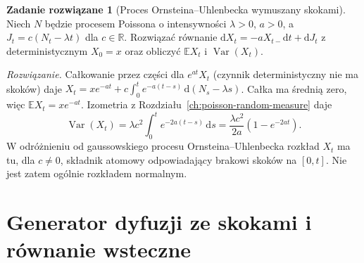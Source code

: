 \documentclass[11pt,a4paper,oneside]{report}
\numberwithin{equation}{chapter}
\theoremstyle{plain}
\theoremstyle{definition}
\newtheorem{zadanie}{Zadanie rozwiązane}[chapter]
\theoremstyle{remark}
\newcommand{\R}{\mathbb{R}}
\newcommand{\E}{\mathbb{E}}
\newcommand{\Var}{\operatorname{Var}}
\newcommand{\dd}{\mathrm{d}}
\begin{document}
\begin{zadanie}[Proces Ornsteina--Uhlenbecka wymuszany skokami]
Niech $N$ będzie procesem Poissona o intensywności
$\lambda>0$, $a>0$, a $J_t=c(N_t-\lambda t)$ dla
$c\in\R$. Rozwiązać równanie
$\dd X_t=-aX_{t-}\dd t+\dd J_t$ z deterministycznym
$X_0=x$ oraz obliczyć $\E X_t$ i $\Var(X_t)$.

\emph{Rozwiązanie.} Całkowanie przez części dla
$e^{at}X_t$ (czynnik deterministyczny nie ma skoków)
daje
$X_t=xe^{-at}+c\int_0^te^{-a(t-s)}\,\dd(N_s-\lambda s)$.
Całka ma średnią zero, więc $\E X_t=xe^{-at}$.
Izometria z Rozdziału~\ref{ch:poisson-random-measure} daje
\[
\Var(X_t)=\lambda c^2\int_0^t e^{-2a(t-s)}\,\dd s
=\frac{\lambda c^2}{2a}(1-e^{-2at}).
\]
W odróżnieniu od gaussowskiego procesu
Ornsteina--Uhlenbecka rozkład $X_t$ ma tu, dla
$c\ne0$, składnik atomowy odpowiadający brakowi skoków
na $[0,t]$. Nie jest zatem ogólnie rozkładem normalnym.
\end{zadanie}

\section{Generator dyfuzji ze skokami i równanie wsteczne}
\end{document}
